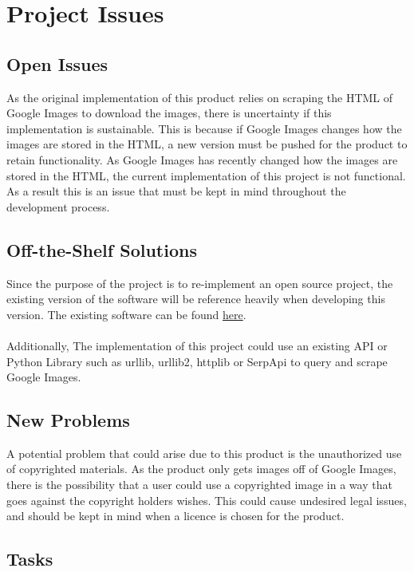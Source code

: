 \documentclass[12pt, titlepage]{article}
\begin{document}
\color{black}

\section{Project Issues}

\subsection{Open Issues}

As the original implementation of this product relies on scraping the HTML of Google Images to download the images, there is uncertainty if this implementation is sustainable. This is because if Google Images changes how the images are stored in the HTML, a new version must be pushed for the product to retain functionality. As Google Images has recently changed how the images are stored in the HTML, the current implementation of this project is not functional. As a result this is an issue that must be kept in mind throughout the development process.

\subsection{Off-the-Shelf Solutions}

Since the purpose of the project is to re-implement an open source project, the existing version of the software will be reference heavily when developing  this  version.   The existing software can be found \href{https://github.com/hardikvasa/google-images-download.}{here}.
\\
\\
Additionally, The implementation of this project could use an existing API or Python Library such as urllib, urllib2, httplib or SerpApi to query  and scrape Google Images.

\subsection{New Problems}

A potential problem that could arise due to this product is the unauthorized use of copyrighted materials. As the product only gets images off of Google Images, there is the possibility that a user could use a copyrighted image in a way that goes against the copyright holders wishes. This could cause undesired legal issues, and should be kept in mind when a licence is chosen for the product.

\subsection{Tasks}
\end{document}

